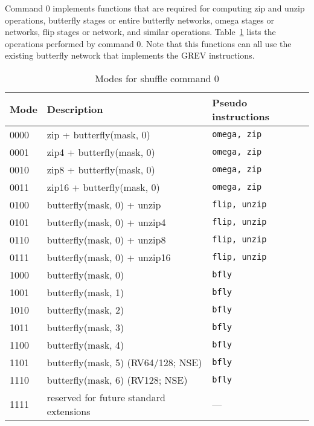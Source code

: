 Command 0 implements functions that are required for computing zip and unzip
operations, butterfly stages or entire butterfly networks, omega stages or networks, flip
stages or network, and similar operations. Table~\ref{shuffle-modes} lists the
operations performed by command 0. Note that this functions can all use the
existing butterfly network that implements the GREV instructions.

\begin{table}[h]
\begin{small}
\begin{center}
\begin{tabular}{l l l}
Mode & Description & Pseudo instructions \\ \hline

0000 & zip + butterfly(mask, 0)                    & {\tt omega, zip} \\
0001 & zip4 + butterfly(mask, 0)                   & {\tt omega, zip} \\
0010 & zip8 + butterfly(mask, 0)                   & {\tt omega, zip} \\
0011 & zip16 + butterfly(mask, 0)                  & {\tt omega, zip} \\
0100 & butterfly(mask, 0) + unzip                  & {\tt flip, unzip} \\
0101 & butterfly(mask, 0) + unzip4                 & {\tt flip, unzip} \\
0110 & butterfly(mask, 0) + unzip8                 & {\tt flip, unzip} \\
0111 & butterfly(mask, 0) + unzip16                & {\tt flip, unzip} \\

\hline

1000 & butterfly(mask, 0)                          & {\tt bfly} \\
1001 & butterfly(mask, 1)                          & {\tt bfly} \\
1010 & butterfly(mask, 2)                          & {\tt bfly} \\
1011 & butterfly(mask, 3)                          & {\tt bfly} \\
1100 & butterfly(mask, 4)                          & {\tt bfly} \\
1101 & butterfly(mask, 5) (RV64/128; NSE)          & {\tt bfly} \\
1110 & butterfly(mask, 6) (RV128; NSE)             & {\tt bfly} \\
1111 & reserved for future standard extensions     & --- \\

\end{tabular}
\end{center}
\end{small}
\caption{Modes for shuffle command 0}
\label{shuffle-modes}
\end{table}

